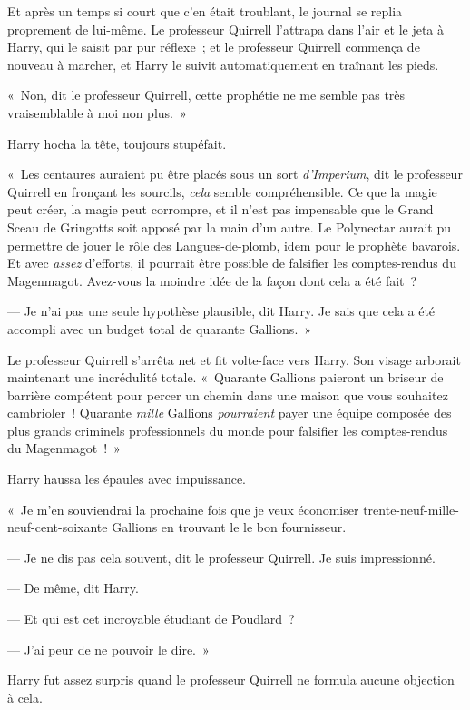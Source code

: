 Et après un temps si court que c'en était troublant, le journal se replia proprement de lui-même. Le professeur Quirrell l'attrapa dans l'air et le jeta à Harry, qui le saisit par pur réflexe~; et le professeur Quirrell commença de nouveau à marcher, et Harry le suivit automatiquement en traînant les pieds.

«~Non, dit le professeur Quirrell, cette prophétie ne me semble pas très vraisemblable à moi non plus.~»

Harry hocha la tête, toujours stupéfait.

«~Les centaures auraient pu être placés sous un sort \emph{d'Imperium}, dit le professeur Quirrell en fronçant les sourcils, \emph{cela} semble compréhensible. Ce que la magie peut créer, la magie peut corrompre, et il n'est pas impensable que le Grand Sceau de Gringotts soit apposé par la main d'un autre. Le Polynectar aurait pu permettre de jouer le rôle des Langues-de-plomb, idem pour le prophète bavarois. Et avec \emph{assez} d'efforts, il pourrait être possible de falsifier les comptes-rendus du Magenmagot. Avez-vous la moindre idée de la façon dont cela a été fait~?

--- Je n'ai pas une seule hypothèse plausible, dit Harry. Je sais que cela a été accompli avec un budget total de quarante Gallions.~»

Le professeur Quirrell s'arrêta net et fit volte-face vers Harry. Son visage arborait maintenant une incrédulité totale. «~Quarante Gallions paieront un briseur de barrière compétent pour percer un chemin dans une maison que vous souhaitez cambrioler~! Quarante \emph{mille} Gallions \emph{pourraient} payer une équipe composée des plus grands criminels professionnels du monde pour falsifier les comptes-rendus du Magenmagot~!~»

Harry haussa les épaules avec impuissance.

«~Je m'en souviendrai la prochaine fois que je veux économiser trente-neuf-mille-neuf-cent-soixante Gallions en trouvant le le bon fournisseur.

--- Je ne dis pas cela souvent, dit le professeur Quirrell. Je suis impressionné.

--- De même, dit Harry.

--- Et qui est cet incroyable étudiant de Poudlard~?

--- J'ai peur de ne pouvoir le dire.~»

Harry fut assez surpris quand le professeur Quirrell ne formula aucune objection à cela.

